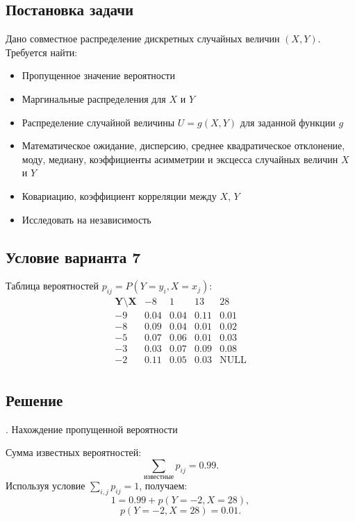 \documentclass[a4paper,14pt]{extarticle}
\begin{document}
        \subsection*{Постановка задачи}
        Дано совместное распределение дискретных случайных величин $(X, Y )$. Требуется найти:
        \begin{itemize}
            \item Пропущенное значение вероятности
            \item Маргинальные распределения для $X$ и $Y$
            \item Распределение случайной величины $U = g(X, Y)$ для заданной функции $g$
            \item Математическое ожидание, дисперсию, среднее квадратическое отклонение, моду, медиану, коэффициенты асимметрии и эксцесса случайных величин $X$ и $Y$
            \item Ковариацию, коэффициент корреляции между $X$, $Y$
            \item Исследовать на независимость
        \end{itemize}
        \subsection*{Условие варианта 7}
        Таблица вероятностей $p_{ij} = P(Y=y_i, X=x_j)$:
        \[
        \begin{array}{c|cccc}
        \mathbf{Y \setminus X} & -8 & 1 & 13 & 28 \\
        \hline
        -9 & 0.04 & 0.04 & 0.11 & 0.01  \\
        -8 & 0.09 & 0.04 & 0.01 & 0.02  \\
        -5 & 0.07 & 0.06 & 0.01 & 0.03  \\
        -3 & 0.03 & 0.07 & 0.09 & 0.08  \\
        -2 & 0.11 & 0.05 & 0.03 & \text{NULL}  \\
        \end{array}
        \]
        \subsection*{Решение}

        . Нахождение пропущенной вероятности

        Сумма известных вероятностей:
        \[
        \sum_{\text{известные}} p_{ij} = 0.99.
        \]
        Используя условие $\sum_{i,j} p_{ij} = 1$, получаем:
        \[
        1 = 0.99 + p(Y=-2, X=28),
        \]
        \[
        \boxed{p(Y=-2, X=28) = 0.01.}
        \]
\end{document}
